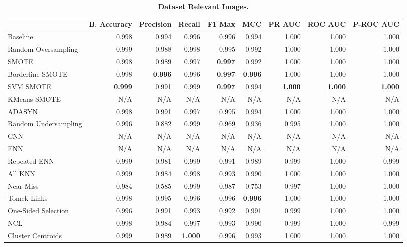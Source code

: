 \begin{table}[H]
    \centering
    \setlength\tabcolsep{2pt}
    \begin{tabularx}{\textwidth}{lRRRRRRRR}
        & B. Accuracy & Precision & Recall & F1 Max & MCC & PR AUC & ROC AUC & P-ROC AUC \\
        \midrule
        Baseline & 0.998 & 0.994 & 0.996 & 0.996 & 0.994 & 1.000 & 1.000 & 1.000 \\
        Random Oversampling & 0.999 & 0.988 & 0.998 & 0.995 & 0.992 & 1.000 & 1.000 & 1.000 \\
        SMOTE & 0.998 & 0.989 & 0.997 & \textbf{0.997} & 0.992 & 1.000 & 1.000 & 1.000 \\
        Borderline SMOTE & 0.998 & \textbf{0.996} & 0.996 & \textbf{0.997} & \textbf{0.996} & 1.000 & 1.000 & 1.000 \\
        SVM SMOTE & \textbf{0.999} & 0.991 & 0.999 & \textbf{0.997} & 0.994 & \textbf{1.000} & \textbf{1.000} & \textbf{1.000} \\
        KMeans SMOTE & N/A & N/A & N/A & N/A & N/A & N/A & N/A & N/A \\
        ADASYN & 0.998 & 0.991 & 0.997 & 0.995 & 0.994 & 1.000 & 1.000 & 1.000 \\
        Random Undersampling & 0.996 & 0.882 & 0.999 & 0.969 & 0.936 & 0.995 & 1.000 & 1.000 \\
        CNN & N/A & N/A & N/A & N/A & N/A & N/A & N/A & N/A \\
        ENN & N/A & N/A & N/A & N/A & N/A & N/A & N/A & N/A \\
        Repeated ENN & 0.999 & 0.981 & 0.999 & 0.991 & 0.989 & 0.999 & 1.000 & 0.999 \\
        All KNN & 0.999 & 0.984 & 0.998 & 0.993 & 0.990 & 1.000 & 1.000 & 1.000 \\
        Near Miss & 0.984 & 0.585 & 0.999 & 0.987 & 0.753 & 0.997 & 1.000 & 1.000 \\
        Tomek Links & 0.998 & 0.995 & 0.996 & 0.996 & \textbf{0.996} & 1.000 & 1.000 & 1.000 \\
        One-Sided Selection & 0.996 & 0.991 & 0.993 & 0.992 & 0.991 & 0.999 & 1.000 & 1.000 \\
        NCL & 0.998 & 0.984 & 0.997 & 0.993 & 0.990 & 0.999 & 1.000 & 0.999 \\
        Cluster Centroids & 0.999 & 0.989 & \textbf{1.000} & 0.996 & 0.993 & 1.000 & 1.000 & 1.000 \\
    \end{tabularx}
    \vspace{1mm}
    \caption{\textbf{Dataset Relevant Images.}}
\end{table}
